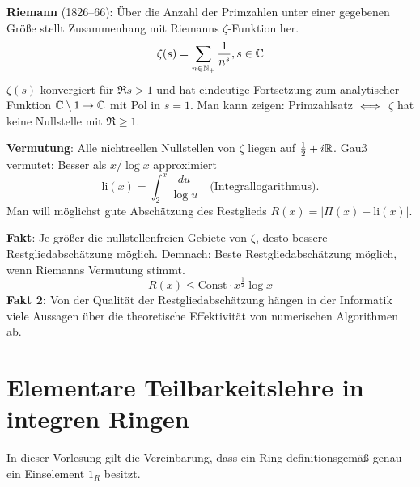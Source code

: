 \documentclass[a4paper,twoside,DIV15,BCOR12mm]{scrbook}
\begin{document}
\textbf{Riemann} (1826--66): \glqq Über die Anzahl der Primzahlen
unter einer gegebenen Größe\grqq{}  stellt Zusammenhang mit Riemanns
$\zeta$-Funktion her.
\[ \zeta(s) = \sum_{n\in\mathbb{N}_+} \frac{1}{n^s}, s\in\mathbb{C} \]
$\zeta(s)$ konvergiert für $\Re s>1$ und hat eindeutige Fortsetzung
zum analytischer Funktion $\mathbb{C}\setminus1\to\mathbb{C}$ mit Pol in $s=1$.
Man kann zeigen: Primzahlsatz $\iff$ $\zeta$ hat keine Nullstelle
mit $\Re \ge 1$.

\textbf{Vermutung}: Alle nichtreellen Nullstellen von $\zeta$ liegen
auf $\frac12+i\mathbb{R}$. Gauß vermutet: Besser als $x/\log x$
approximiert
\[ \text{li}(x) = \int_2^x \frac {du}{\log u} \quad \text{(Integrallogarithmus).} \]
Man will möglichst gute Abschätzung des Restglieds $R(x) = |\Pi(x) -
\text{li}(x)|$.

\textbf{Fakt}: Je größer die nullstellenfreien Gebiete von $\zeta$,
desto bessere Restgliedabschätzung möglich. Demnach: Beste
Restgliedabschätzung möglich, wenn Riemanns Vermutung stimmt.
\[ R(x) \le \text{Const} \cdot x^{\frac 12} \log x \]
\textbf{Fakt 2:} Von der Qualität der Restgliedabschätzung hängen in
der Informatik viele Aussagen über die theoretische Effektivität von
numerischen Algorithmen ab.

\section{Elementare Teilbarkeitslehre in integren Ringen}
In dieser Vorlesung gilt die Vereinbarung, dass ein Ring
definitionsgemäß genau ein Einselement $1_R$ besitzt.
\end{document}
